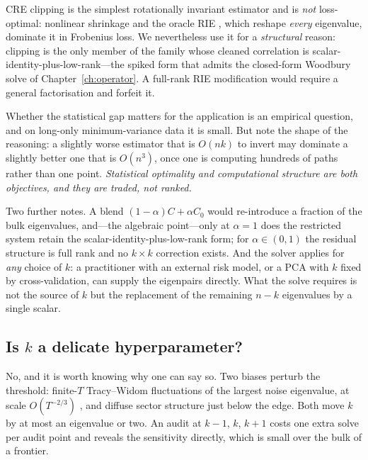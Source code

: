 \begin{remark}
\label{rem:rie}
CRE clipping is the simplest rotationally invariant estimator and is \emph{not}
loss-optimal: nonlinear shrinkage \cite{ledoit2012,ledoit2020} and the oracle RIE
\cite{ledoitpeche2011,bun2017}, which reshape \emph{every} eigenvalue, dominate it in
Frobenius loss. We nevertheless use it for a \emph{structural} reason: clipping is the
only member of the family whose cleaned correlation is
scalar-identity-plus-low-rank---the spiked form \cite{johnstone2001} that admits the
closed-form Woodbury solve of Chapter~\ref{ch:operator}. A full-rank RIE modification
would require a general factorisation and forfeit it.

Whether the statistical gap matters for the application is an empirical question, and
on long-only minimum-variance data it is small. But note the shape of the reasoning:
a slightly worse estimator that is $O(nk)$ to invert may dominate a slightly better one
that is $O(n^3)$, once one is computing hundreds of paths rather than one point.
\emph{Statistical optimality and computational structure are both objectives, and they
are traded, not ranked.}
\end{remark}

Two further notes. A blend $(1-\alpha)C + \alpha C_0$ would re-introduce a fraction of
the bulk eigenvalues, and---the algebraic point---only at $\alpha = 1$ does the
restricted system retain the scalar-identity-plus-low-rank form; for
$\alpha \in (0,1)$ the residual structure is full rank and no $k\times k$ correction
exists. And the solver applies for \emph{any} choice of $k$: a practitioner with an
external risk model, or a PCA with $k$ fixed by cross-validation, can supply the
eigenpairs directly. What the solve requires is not the source of $k$ but the
replacement of the remaining $n-k$ eigenvalues by a single scalar.

\subsection{Is $k$ a delicate hyperparameter?}

No, and it is worth knowing why one can say so. Two biases perturb the threshold:
finite-$T$ Tracy--Widom fluctuations of the largest noise eigenvalue, at scale
$O(T^{-2/3})$ \cite{johnstone2001,elkaroui2008}, and diffuse sector structure just below
the edge. Both move $k$ by at most an eigenvalue or two. An audit at $k-1$, $k$, $k+1$
costs one extra solve per audit point and reveals the sensitivity directly, which is
small over the bulk of a frontier.

